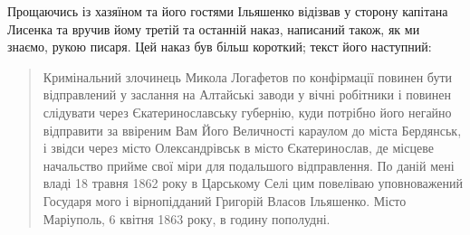 \documentclass[a4paper,20pt]{report}
\begin{document}
Прощаючись із хазяїном та його гостями Ільяшенко відізвав у сторону
капітана Лисенка та вручив йому третій та останній наказ, написаний також, як ми знаємо,
рукою писаря. Цей наказ був більш короткий; текст його наступний:
\begin{quote}
\em\bfseries

Кримінальний злочинець Микола Логафетов по конфірмації повинен
бути відправлений у заслання на Алтайські заводи у вічні робітники і повинен
слідувати через Єкатеринославську губернію, куди потрібно його негайно відправити
за ввіреним Вам Його Величності караулом до міста Бердянськ, і звідси через місто Олександрівськ
в місто Єкатеринослав, де місцеве начальство прийме свої міри для подальшого відправлення. По даній
мені владі 18 травня 1862 року в Царському Селі цим повеліваю уповноважений Государя мого і вірнопідданий
Григорій Власов Ільяшенко. Місто Маріуполь, 6 квітня 1863 року, в годину пополудні.
\end{quote}
\end{document}
